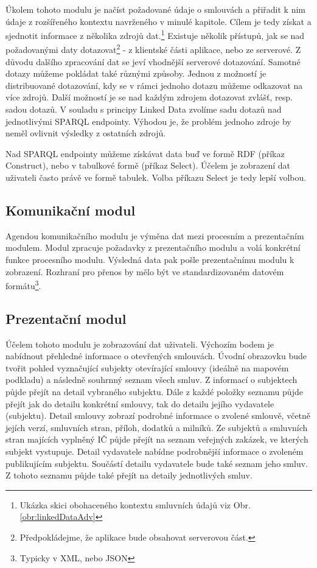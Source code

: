 Úkolem tohoto modulu je načíst požadované údaje o smlouvách a přiřadit k nim údaje z rozšířeného kontextu navrženého v minulé kapitole. Cílem je tedy získat a sjednotit informace z několika zdrojů dat.\footnote{Ukázka skici obohaceného kontextu smluvních údajů viz Obr. \ref{obr:linkedDataAdv}} Existuje několik přístupů, jak se nad požadovanými daty dotazovat\footnote{Předpokládejme, že aplikace bude obsahovat serverovou část.} - z klientské části aplikace, nebo ze serverové. Z důvodu dalšího zpracování dat se jeví vhodnější serverové dotazování. Samotné dotazy můžeme pokládat také různými způsoby. Jednou z možností je distribuované dotazování, kdy se v rámci jednoho dotazu můžeme odkazovat na více zdrojů. Další možností je se nad každým zdrojem dotazovat zvlášť, resp. sadou dotazů. V souladu s principy Linked Data zvolíme sadu dotazů nad jednotlivými SPARQL endpointy. Výhodou je, že problém jednoho zdroje by neměl ovlivnit výsledky z ostatních zdrojů. 

Nad SPARQL endpointy můžeme získávat data buď ve formě RDF (příkaz Construct), nebo v tabulkové formě (příkaz Select). Účelem je zobrazení dat uživateli často právě ve formě tabulek. Volba příkazu Select je tedy lepší volbou.

\subsection*{Komunikační modul}

Agendou komunikačního modulu je výměna dat mezi procesním a prezentačním modulem. Modul zpracuje požadavky z prezentačního modulu a volá konkrétní funkce procesního modulu. Výsledná data pak pošle prezentačnímu modulu k zobrazení. Rozhraní pro přenos by mělo být ve standardizovaném datovém formátu\footnote{Typicky v XML, nebo JSON}.

\subsection*{Prezentační modul}

Účelem tohoto modulu je zobrazování dat uživateli. Výchozím bodem je nabídnout přehledné informace o otevřených smlouvách. Úvodní obrazovku bude tvořit pohled vyznačující subjekty otevírající smlouvy (ideálně na mapovém podkladu) a následně souhrnný seznam všech smluv. Z informací o subjektech půjde přejít na detail vybraného subjektu. Dále z každé položky seznamu půjde přejít jak do detailu konkrétní smlouvy, tak do detailu jejího vydavatele (subjektu). Detail smlouvy zobrazí podrobné informace o zvolené smlouvě, včetně jejích verzí, smluvních stran, příloh, dodatků a milníků. Ze subjektů a smluvních stran majících vyplněný IČ půjde přejít na seznam veřejných zakázek, ve kterých subjekt vystupuje. Detail vydavatele nabídne podrobnější informace o zvoleném publikujícím subjektu. Součástí detailu vydavatele bude také seznam jeho smluv. Z tohoto seznamu půjde také přejít na detaily jednotlivých smluv.

